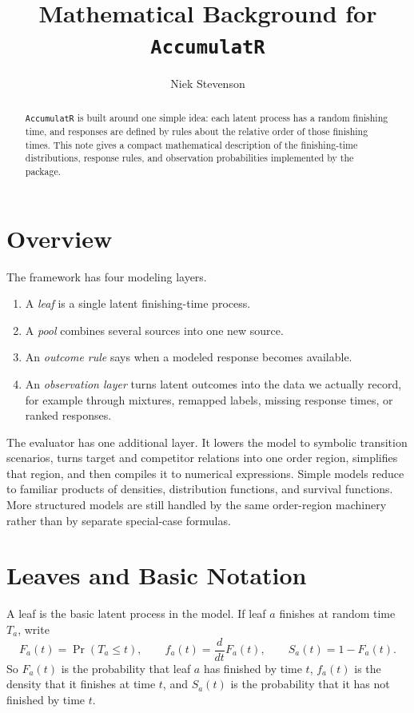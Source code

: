 \documentclass[11pt]{article}
\title{Mathematical Background for \texttt{AccumulatR}}
\author{Niek Stevenson}
\date{}
\begin{document}
\maketitle

\begin{abstract}
\texttt{AccumulatR} is built around one simple idea: each latent process has a
random finishing time, and responses are defined by rules about the relative
order of those finishing times. This note gives a compact mathematical
description of the finishing-time distributions, response rules, and observation
probabilities implemented by the package.
\end{abstract}

\section{Overview}

The framework has four modeling layers.
\begin{enumerate}
  \item A \emph{leaf} is a single latent finishing-time process.
  \item A \emph{pool} combines several sources into one new source.
  \item An \emph{outcome rule} says when a modeled response becomes available.
  \item An \emph{observation layer} turns latent outcomes into the data we
  actually record, for example through mixtures, remapped labels, missing
  response times, or ranked responses.
\end{enumerate}

The evaluator has one additional layer. It lowers the model to symbolic
transition scenarios, turns target and competitor relations into one order
region, simplifies that region, and then compiles it to numerical expressions.
Simple models reduce to familiar products of densities, distribution functions,
and survival functions. More structured models are still handled by the same
order-region machinery rather than by separate special-case formulas.

\section{Leaves and Basic Notation}

A leaf is the basic latent process in the model. If leaf $a$ finishes at
random time $T_a$, write
\[
F_a(t) = \Pr(T_a \le t), \qquad
f_a(t) = \frac{d}{dt}F_a(t), \qquad
S_a(t) = 1 - F_a(t).
\]
So $F_a(t)$ is the probability that leaf $a$ has finished by time $t$,
$f_a(t)$ is the density that it finishes at time $t$, and $S_a(t)$ is the
probability that it has not finished by time $t$.
\end{document}
